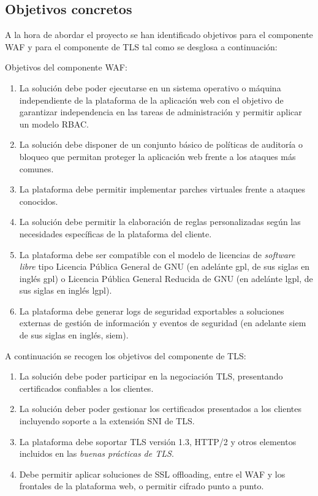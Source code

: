 \subsection{Objetivos concretos}
\par A la hora de abordar el proyecto se han identificado objetivos para el componente WAF y para el componente de TLS tal como se desglosa a continuación:
\par Objetivos del componente WAF:
\begin{enumerate}
  \item La solución debe poder ejecutarse en un sistema operativo o máquina independiente de la plataforma de la aplicación web con el
    objetivo de garantizar independencia en las tareas de administración y permitir aplicar un modelo RBAC.
  \item La solución debe disponer de un conjunto básico de políticas de auditoría o bloqueo que permitan proteger la aplicación web frente a
    los ataques más comunes.
  \item La plataforma debe permitir implementar parches virtuales frente a ataques conocidos.
  \item La solución debe permitir la elaboración de reglas personalizadas según las necesidades específicas de la plataforma del cliente.
  \item La plataforma debe ser compatible con el modelo de licencias de {\em software libre\cite{softwarelibre}} tipo
    Licencia Pública General de GNU (en adelánte \acrshort{gpl}, de  sus siglas en inglés \acrlong{gpl}) o Licencia Pública General Reducida
    de GNU (en adelánte \acrshort{lgpl}, de  sus siglas en inglés \acrlong{lgpl}).
  \item La plataforma debe generar logs de seguridad exportables a soluciones externas de gestión de información y eventos de seguridad (en
    adelante \acrshort{siem} de sus siglas en inglés, \acrlong{siem}).
\end{enumerate}

\par A continuación se recogen los objetivos del componente de TLS:
\begin{enumerate}
  \item La solución debe poder participar en la negociación TLS, presentando certificados confiables a los clientes.
  \item La solución deber poder gestionar los certificados presentados a los clientes incluyendo soporte a la extensión \acrshort{SNI} de TLS.
  \item La plataforma debe soportar TLS versión 1.3, HTTP/2 y otros elementos incluidos en las {\em buenas prácticas de TLS\cite{TLSBestPractices}}.
  \item Debe permitir aplicar soluciones de SSL offloading, entre el WAF y los frontales de la plataforma web, o permitir cifrado punto a punto.
\end{enumerate}

